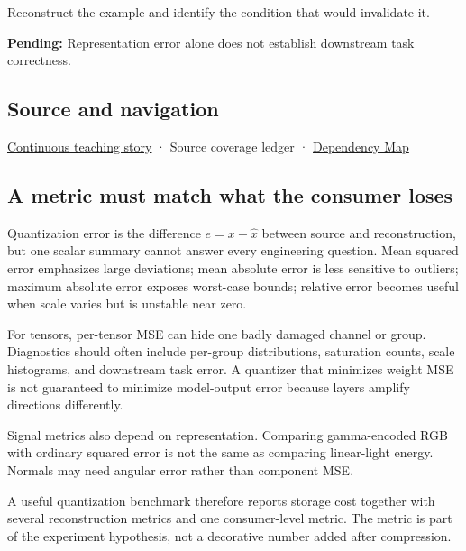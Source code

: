 Reconstruct the example and identify the condition that would invalidate it.

\textbf{Pending:} Representation error alone does not establish downstream task correctness.

\subsection{Source and navigation}\label{appendix-537171d69d27-source-and-navigation}

\hyperref[01-foundations-i-ch001-choosing-what-information-to-keep]{Continuous teaching story} · {Source coverage ledger} · \hyperref[appendix-4ad47bdd269a]{Dependency Map}

\subsection{A metric must match what the consumer loses}\label{appendix-537171d69d27-a-metric-must-match-what-the-consumer-loses}

Quantization error is the difference \(e=x-\hat x\) between source and reconstruction, but one scalar summary cannot answer every engineering question. Mean squared error emphasizes large deviations; mean absolute error is less sensitive to outliers; maximum absolute error exposes worst-case bounds; relative error becomes useful when scale varies but is unstable near zero.

For tensors, per-tensor MSE can hide one badly damaged channel or group. Diagnostics should often include per-group distributions, saturation counts, scale histograms, and downstream task error. A quantizer that minimizes weight MSE is not guaranteed to minimize model-output error because layers amplify directions differently.

Signal metrics also depend on representation. Comparing gamma-encoded RGB with ordinary squared error is not the same as comparing linear-light energy. Normals may need angular error rather than component MSE.

A useful quantization benchmark therefore reports storage cost together with several reconstruction metrics and one consumer-level metric. The metric is part of the experiment hypothesis, not a decorative number added after compression.
